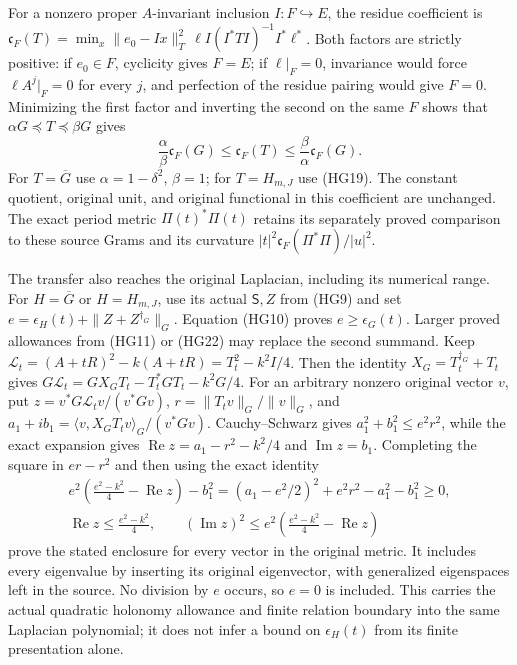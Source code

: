 \documentclass{article}
\begin{document}
For a nonzero proper $A$-invariant inclusion $I:F\hookrightarrow E$,
the residue coefficient is
$\mathfrak c_F(T)=\min_x\|e_0-Ix\|_T^2\,
\ell I(I^*TI)^{-1}I^*\ell^*$.
Both factors are strictly positive: if $e_0\in F$, cyclicity gives
$F=E$; if $\ell|_F=0$, invariance would force
$\ell A^j|_F=0$ for every $j$, and perfection of the residue pairing
would give $F=0$. Minimizing the first factor and inverting the second
on the same $F$ shows that $\alpha G\preceq T\preceq\beta G$ gives
\[
 \frac{\alpha}{\beta}\mathfrak c_F(G)
 \le\mathfrak c_F(T)\le
 \frac{\beta}{\alpha}\mathfrak c_F(G).
 \tag{HG24}
\]
For $T=\overline G$ use $\alpha=1-\delta^2$, $\beta=1$;
for $T=H_{m,J}$ use (HG19). The constant quotient, original unit,
and original functional in this coefficient are unchanged.
The exact period metric $\Pi(t)^*\Pi(t)$ retains its separately
proved comparison to these source Grams and its curvature
$|t|^2\mathfrak c_F(\Pi^*\Pi)/|u|^2$.

The transfer also reaches the original Laplacian, including its
numerical range. For $H=\overline G$ or $H=H_{m,J}$, use its actual
$\mathsf S,Z$ from (HG9) and set
$e=\epsilon_H(t)+\|Z+Z^{\dagger_G}\|_G$.
Equation (HG10) proves $e\ge\epsilon_G(t)$. Larger proved allowances
from (HG11) or (HG22) may replace the second summand. Keep
$\mathcal L_t=(A+tR)^2-k(A+tR)=T_t^2-k^2I/4$.
Then the identity $X_G=T_t^{\dagger_G}+T_t$ gives
$G\mathcal L_t=GX_GT_t-T_t^*GT_t-k^2G/4$.
For an arbitrary nonzero original vector $v$, put
$z=v^*G\mathcal L_tv/(v^*Gv)$,
$r=\|T_tv\|_G/\|v\|_G$, and
$a_1+ib_1=\langle v,X_GT_tv\rangle_G/(v^*Gv)$.
Cauchy--Schwarz gives $a_1^2+b_1^2\le e^2r^2$, while the exact
expansion gives $\operatorname{Re}z=a_1-r^2-k^2/4$ and
$\operatorname{Im}z=b_1$. Completing the square in $er-r^2$
and then using the exact identity
\[
\begin{gathered}
 e^2\left(\frac{e^2-k^2}{4}-\operatorname{Re}z\right)-b_1^2
 =(a_1-e^2/2)^2+e^2r^2-a_1^2-b_1^2\ge0,\\
 \operatorname{Re}z\le\frac{e^2-k^2}{4},\qquad
 (\operatorname{Im}z)^2\le
 e^2\left(\frac{e^2-k^2}{4}-\operatorname{Re}z\right)
\end{gathered}\tag{HG25}
\]
prove the stated enclosure for every vector in the original metric.
It includes every eigenvalue by inserting its original eigenvector,
with generalized eigenspaces left in the source. No division by $e$
occurs, so $e=0$ is included. This carries the actual quadratic
holonomy allowance and finite relation boundary into the same
Laplacian polynomial; it does not infer a bound on $\epsilon_H(t)$
from its finite presentation alone.
\end{document}

